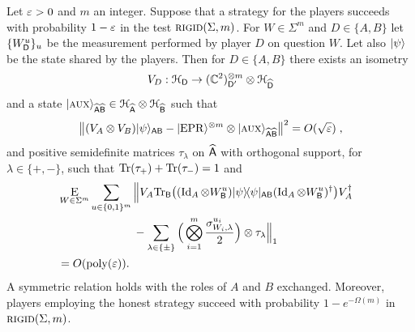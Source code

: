 \begin{theorem}\label{thm:clifford-rigid}
Let $\varepsilon>0$ and $m$ an integer. Suppose that a strategy for the players succeeds with probability $1-\varepsilon$ in the test $\textsc{rigid}(\Sigma,m)$. 
For $W\in\Sigma^m$ and $D\in\{A,B\}$ let $\{W^u_{\textsf{D}}\}_u$ be the measurement performed by player $D$ on question $W$. Let also $|\psi\rangle$ be the state shared by the players.
Then for $D\in\{A,B\}$ there exists an isometry 
$$V_D: \mathcal{H}_{\textsf{D}} \to (\mathbb{C}^2)^{\otimes m}_{{\textsf{D}}'} \otimes {\mathcal{H}}_{\widehat{{\textsf{D}}}}$$
and a state  $|\textsc {aux}\rangle_{\widehat{{\textsf{A}}}\widehat{{\textsf{B}}}} \in {\mathcal{H}}_{\widehat{{\textsf{A}}}}\otimes {\mathcal{H}}_{\widehat{{\textsf{B}}}}$
such that
\begin{equation}
 \big\| (V_A \otimes V_B) |\psi\rangle_{{\textsf{AB}}}  - |{\rm EPR}\rangle^{\otimes m} \otimes |\textsc {aux}\rangle_{\widehat{{\textsf{A}}}\widehat{{\textsf{B}}}} \big\|^2 = O(\sqrt{\varepsilon})\;,
\end{equation}
and positive semidefinite matrices $\tau_\lambda$ on $\widehat{{\textsf{A}}}$ with orthogonal support, for $\lambda\in\{+,-\}$, such that $\mbox{\rm Tr}(\tau_+)+\mbox{\rm Tr}(\tau_-)=1$ and
\begin{align}
  &\mathop{\textsc{E}}_{W\in\Sigma^m} \sum_{u\in\{0,1\}^{m}} \Big\|V_A
  \mbox{\rm Tr}_{{\textsf{B}}}\big((\mathop{\rm Id}\nolimits_A \otimes W_{{\textsf{B}}}^u) |\psi\rangle\!\langle\psi|_{{\textsf{AB}}} (\mathop{\rm Id}\nolimits_A
  \otimes W_{{\textsf{B}}}^u)^\dagger\big) V_A^\dagger \notag\\
  &\;\;\;\;\;\;\;\;\;\;\;\;\;\;\;\;\;\;\;\;\;\;\;\;- \sum_{\lambda\in\{\pm\}} \Big( \bigotimes_{i=1}^m \frac{\sigma_{W_{i},\lambda}^{u_{i}}}{2}\Big)\otimes \tau_\lambda  \Big\|_1\notag\\
  &= O(\operatorname{poly}(\varepsilon)).&\label{eq:rigid-4}
\end{align}
A symmetric relation holds with the roles of $A$ and $B$ exchanged. 
Moreover, players employing the honest strategy succeed with probability $1-e^{-\Omega(m)}$ in $\textsc{rigid}(\Sigma,m)$.  
\end{theorem}

